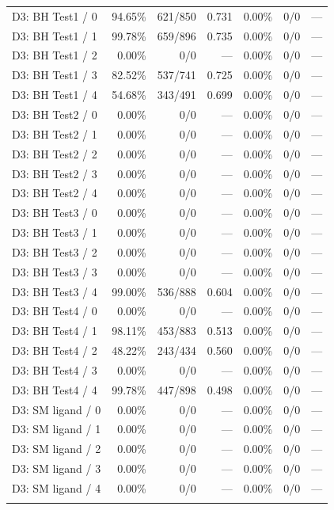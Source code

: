 \begin{longtable}{@{}lrrrrrr@{}}
\addlinespace
D3: BH Test1 / 0 & 94.65\% & 621/850 & 0.731 & 0.00\% & 0/0 & --- \\
D3: BH Test1 / 1 & 99.78\% & 659/896 & 0.735 & 0.00\% & 0/0 & --- \\
D3: BH Test1 / 2 & 0.00\% & 0/0 & --- & 0.00\% & 0/0 & --- \\
D3: BH Test1 / 3 & 82.52\% & 537/741 & 0.725 & 0.00\% & 0/0 & --- \\
D3: BH Test1 / 4 & 54.68\% & 343/491 & 0.699 & 0.00\% & 0/0 & --- \\
\addlinespace
D3: BH Test2 / 0 & 0.00\% & 0/0 & --- & 0.00\% & 0/0 & --- \\
D3: BH Test2 / 1 & 0.00\% & 0/0 & --- & 0.00\% & 0/0 & --- \\
D3: BH Test2 / 2 & 0.00\% & 0/0 & --- & 0.00\% & 0/0 & --- \\
D3: BH Test2 / 3 & 0.00\% & 0/0 & --- & 0.00\% & 0/0 & --- \\
D3: BH Test2 / 4 & 0.00\% & 0/0 & --- & 0.00\% & 0/0 & --- \\
\addlinespace
D3: BH Test3 / 0 & 0.00\% & 0/0 & --- & 0.00\% & 0/0 & --- \\
D3: BH Test3 / 1 & 0.00\% & 0/0 & --- & 0.00\% & 0/0 & --- \\
D3: BH Test3 / 2 & 0.00\% & 0/0 & --- & 0.00\% & 0/0 & --- \\
D3: BH Test3 / 3 & 0.00\% & 0/0 & --- & 0.00\% & 0/0 & --- \\
D3: BH Test3 / 4 & 99.00\% & 536/888 & 0.604 & 0.00\% & 0/0 & --- \\
\addlinespace
D3: BH Test4 / 0 & 0.00\% & 0/0 & --- & 0.00\% & 0/0 & --- \\
D3: BH Test4 / 1 & 98.11\% & 453/883 & 0.513 & 0.00\% & 0/0 & --- \\
D3: BH Test4 / 2 & 48.22\% & 243/434 & 0.560 & 0.00\% & 0/0 & --- \\
D3: BH Test4 / 3 & 0.00\% & 0/0 & --- & 0.00\% & 0/0 & --- \\
D3: BH Test4 / 4 & 99.78\% & 447/898 & 0.498 & 0.00\% & 0/0 & --- \\
\addlinespace
D3: SM ligand / 0 & 0.00\% & 0/0 & --- & 0.00\% & 0/0 & --- \\
D3: SM ligand / 1 & 0.00\% & 0/0 & --- & 0.00\% & 0/0 & --- \\
D3: SM ligand / 2 & 0.00\% & 0/0 & --- & 0.00\% & 0/0 & --- \\
D3: SM ligand / 3 & 0.00\% & 0/0 & --- & 0.00\% & 0/0 & --- \\
D3: SM ligand / 4 & 0.00\% & 0/0 & --- & 0.00\% & 0/0 & --- \\
\addlinespace
\end{longtable}